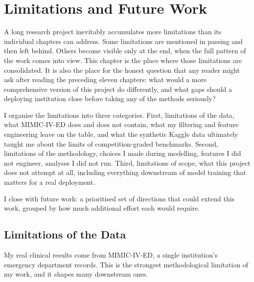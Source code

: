 
\chapter{Limitations and Future Work}
\label{ch:limitations}

A long research project inevitably accumulates more limitations than its individual chapters can address. Some limitations are mentioned in passing and then left behind. Others become visible only at the end, when the full pattern of the work comes into view. This chapter is the place where those limitations are consolidated. It is also the place for the honest question that any reader might ask after reading the preceding eleven chapters: what would a more comprehensive version of this project do differently, and what gaps should a deploying institution close before taking any of the methods seriously?

I organise the limitations into three categories. First, limitations of the data, what MIMIC-IV-ED does and does not contain, what my filtering and feature engineering leave on the table, and what the synthetic Kaggle data ultimately taught me about the limits of competition-graded benchmarks. Second, limitations of the methodology, choices I made during modelling, features I did not engineer, analyses I did not run. Third, limitations of scope, what this project does not attempt at all, including everything downstream of model training that matters for a real deployment.

I close with future work: a prioritised set of directions that could extend this work, grouped by how much additional effort each would require.

\section{Limitations of the Data}

My real clinical results come from MIMIC-IV-ED, a single institution's emergency department records. This is the strongest methodological limitation of my work, and it shapes many downstream ones.

